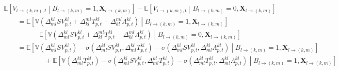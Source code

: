 \begin{linenomath*}
    \begin{equation*}
        \begin{aligned}
            &\mathbb{E}\left[V_{l \rightarrow (k,m),t} \middle\vert  B_{l \rightarrow (k,m)} = 1, \boldsymbol{X}_{l \rightarrow (k,m)}\right] 
                - \mathbb{E}\left[V_{l \rightarrow (k,m),t} \middle\vert  B_{l \rightarrow (k,m)} = 0, \boldsymbol{X}_{l \rightarrow (k,m)}\right] \\
            & \qquad =    
                \mathbb{E}
                \left[
                    \mathbb{V}
                    \left(
                        \Delta_{ml}^{kl}SV_{p,t}^{kl}+ \Delta_{kl}^{ml}T_{p,t}^{kl} - \Delta_{kl}^{ml}\Lambda_{p,t}^{kl}  
                    \right)
                    \middle\vert  B_{l \rightarrow (k,m)} = 1, \boldsymbol{X}_{l \rightarrow (k,m)}
                \right] \\
                & \qquad \qquad -  
                    \mathbb{E}
                    \left[
                        \mathbb{V}
                        \left(
                            \Delta_{ml}^{kl}SV_{p,t}^{kl}+ \Delta_{kl}^{ml}T_{p,t}^{kl} - \Delta_{kl}^{ml}\Lambda_{p,t}^{kl}  
                        \right)
                        \middle\vert  B_{l \rightarrow (k,m)} = 0, \boldsymbol{X}_{l \rightarrow (k,m)}
                    \right] \\
            & \qquad =    
                \mathbb{E}
                \left[
                    \mathbb{V}\left(\Delta_{ml}^{kl}SV_{p,t}^{kl}\right)
                        - \sigma\left(\Delta_{ml}^{kl}SV_{p,t}^{kl},\Delta_{ml}^{kl}T_{p,t}^{kl}\right)
                        - \sigma\left(\Delta_{ml}^{kl}SV_{p,t}^{kl},\Delta_{ml}^{kl}\Lambda_{p,t}^{kl}\right)
                    \middle\vert  B_{l \rightarrow (k,m)} = 1, \boldsymbol{X}_{l \rightarrow (k,m)}
                \right] \\
                    & \qquad \qquad \qquad + 
                        \mathbb{E}
                        \left[
                            \mathbb{V}\left(\Delta_{ml}^{kl}T_{p,t}^{kl}\right)
                                - \sigma\left(\Delta_{ml}^{kl}SV_{p,t}^{kl},\Delta_{ml}^{kl}T_{p,t}^{kl}\right)
                                - \sigma\left(\Delta_{ml}^{kl}T_{p,t}^{kl},\Delta_{ml}^{kl}\Lambda_{p,t}^{kl}\right)
                            \middle\vert  B_{l \rightarrow (k,m)} = 1, \boldsymbol{X}_{l \rightarrow (k,m)}
                        \right] \\

\end{aligned}
\end{equation*}
\end{linenomath*}
